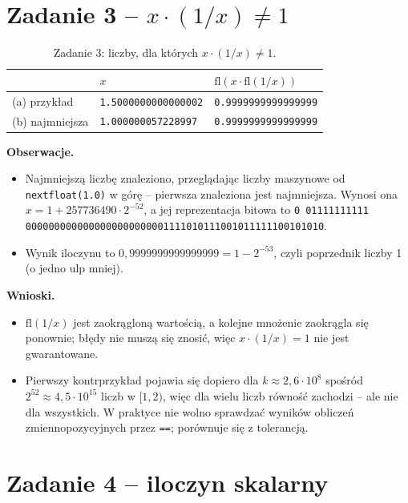 \documentclass[11pt,a4paper]{article}
\begin{document}
\section{Zadanie 3 -- $x\cdot(1/x)\neq1$}

\begin{table}[h]
\centering\small
\begin{tabular}{@{}lll@{}}
\toprule
 & $x$ & $\mathrm{fl}(x\cdot\mathrm{fl}(1/x))$ \\
\midrule
(a) przykład & \texttt{1.5000000000000002} & \texttt{0.9999999999999999} \\
(b) najmniejsza & \texttt{1.000000057228997} & \texttt{0.9999999999999999} \\
\bottomrule
\end{tabular}
\caption{Zadanie 3: liczby, dla których $x\cdot(1/x)\neq1$.}
\end{table}

\textbf{Obserwacje.}
\begin{itemize}
\item Najmniejszą liczbę znaleziono, przeglądając liczby maszynowe od \texttt{nextfloat(1.0)} w górę -- pierwsza znaleziona jest najmniejsza. Wynosi ona $x=1+257736490\cdot2^{-52}$, a jej reprezentacja bitowa to \texttt{0 01111111111 0000000000000000000000001111010111001011111100101010}.
\item Wynik iloczynu to $0{,}9999999999999999=1-2^{-53}$, czyli poprzednik liczby 1 (o jedno ulp mniej).
\end{itemize}

\textbf{Wnioski.}
\begin{itemize}
\item $\mathrm{fl}(1/x)$ jest zaokrągloną wartością, a kolejne mnożenie zaokrągla się ponownie; błędy nie muszą się znosić, więc $x\cdot(1/x)=1$ nie jest gwarantowane.
\item Pierwszy kontrprzykład pojawia się dopiero dla $k\approx2{,}6\cdot10^{8}$ spośród $2^{52}\approx4{,}5\cdot10^{15}$ liczb w $[1,2)$, więc dla wielu liczb równość zachodzi -- ale nie dla wszystkich. W praktyce nie wolno sprawdzać wyników obliczeń zmiennopozycyjnych przez \texttt{==}; porównuje się z tolerancją.
\end{itemize}

\section{Zadanie 4 -- iloczyn skalarny}
\end{document}
